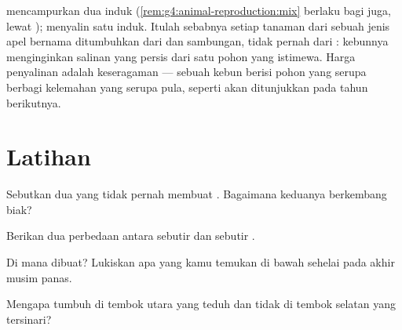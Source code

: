 \begin{remark}\label{rem:g4:plants-without-seeds:copy}
 mencampurkan dua induk
(\cref{rem:g4:animal-reproduction:mix} berlaku bagi  juga,
lewat );  menyalin satu induk.
Itulah sebabnya setiap tanaman dari sebuah jenis apel bernama
ditumbuhkan dari  dan sambungan, tidak pernah dari :
kebunnya menginginkan salinan yang persis dari satu pohon yang
istimewa. Harga penyalinan adalah keseragaman --- sebuah kebun berisi
pohon yang serupa berbagi kelemahan yang serupa pula, seperti akan
ditunjukkan pada tahun berikutnya.
\end{remark}

\section{Latihan}

\begin{exercise}[$\star$]\label{exo:g4:plants-without-seeds:1}
Sebutkan dua  yang tidak pernah membuat . Bagaimana
keduanya berkembang biak?
\end{exercise}

\begin{exercise}[$\star$]\label{exo:g4:plants-without-seeds:2}
Berikan dua perbedaan antara sebutir  dan sebutir .
\end{exercise}

\begin{exercise}[$\star$]\label{exo:g4:plants-without-seeds:3}
Di mana   dibuat? Lukiskan apa yang kamu temukan di
bawah sehelai  pada akhir musim panas.
\end{exercise}

\begin{exercise}[$\star$]\label{exo:g4:plants-without-seeds:4}
Mengapa  tumbuh di tembok utara yang teduh dan tidak di tembok
selatan yang tersinari?
\end{exercise}

